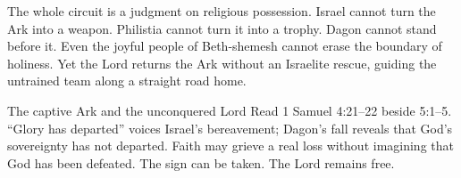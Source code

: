 The whole circuit is a judgment on religious possession.  Israel cannot turn
the Ark into a weapon.  Philistia cannot turn it into a trophy.  Dagon cannot
stand before it.  Even the joyful people of Beth-shemesh cannot erase the
boundary of holiness.  Yet the Lord returns the Ark without an Israelite
rescue, guiding the untrained team along a straight road home.

\begin{studybox}{The captive Ark and the unconquered Lord}
Read 1 Samuel 4:21--22 beside 5:1--5.  ``Glory has departed'' voices Israel's
bereavement; Dagon's fall reveals that God's sovereignty has not departed.
Faith may grieve a real loss without imagining that God has been defeated.
The sign can be taken.  The Lord remains free.
\end{studybox}
